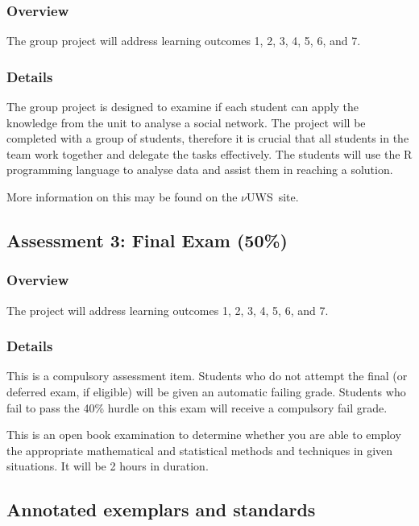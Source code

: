 \documentclass{uws_learning_guide}
\newcommand{\vuws}{$\nu$UWS}
\begin{document}
\subsubsection{Overview}

The group project will address learning outcomes 1, 2, 3, 4, 5, 6, and 7.

\subsubsection{Details}

The group project is designed to examine if each student can apply the
knowledge from the unit to analyse a social network.  The project
will be completed with a group of students, therefore it is crucial
that all students in the team work together and delegate the tasks
effectively. The students will use the R programming language to analyse
data and assist them in reaching a solution.

More information on this may be found on the \vuws~site.


\subsection{Assessment 3: Final Exam (50\%)}

\subsubsection{Overview}

The project will address learning outcomes 1, 2, 3, 4, 5, 6, and 7.

\subsubsection{Details}

This is a compulsory assessment item. Students who do not attempt the
final (or deferred exam, if eligible) will be given an automatic
failing grade.  Students who fail to pass the 40\% hurdle on this exam
will receive a compulsory fail grade.

This is an open book examination to determine whether you are able to
employ the appropriate mathematical and statistical methods and
techniques in given situations. It will be 2 hours in duration.




\subsection{\hintlogo{} Annotated exemplars and standards}
\end{document}
